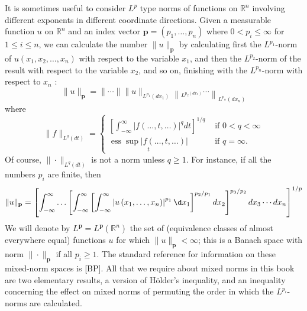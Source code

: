 \begin{para}
  It is sometimes useful to consider $L^p$ type norms of functions on $\mathbb{R}^n$ involving different exponents in different coordinate directions. Given a measurable function $u$ on $\mathbb{R}^n$ and an index vector $\mathbf{p}=\left(p_1, \ldots, p_n\right)$ where $0<p_i \leq \infty$ for $1 \leq i \leq n$, we can calculate the number $\|u\|_{\mathbf{p}}$ by calculating first the $L^{p_1}$-norm of $u\left(x_1, x_2, \ldots, x_n\right)$ with respect to the variable $x_1$, and then the $L^{p_2}$-norm of the result with respect to the variable $x_2$, and so on, finishing with the $L^{p_n}$-norm with respect to $x_n$ :
  \[
  \|u\|_{\mathbf{p}}=\|\cdots\|\|u\|_{L^{p_1}\left(d x_1\right)}\left\|_{L^{p_2\left(d x_2\right)}} \cdots\right\|_{L^{p_n}\left(d x_n\right)}
  \]
  where
  \[
  \|f\|_{L^q(d t)}= \begin{cases}{\left[\int_{-\infty}^{\infty}|f(\ldots, t, \ldots)|^q d t\right]^{1 / q}} & \text { if } 0<q<\infty \\ \underset{t}{\operatorname{ess} \sup |f(\ldots, t, \ldots)|} & \text { if } q=\infty .\end{cases}
  \]
  Of course, $\|\cdot\|_{L^q(d t)}$ is not a norm unless $q \geq 1$. For instance, if all the numbers $p_i$ are finite, then
  \[
  \|u\|_{\mathbf{p}}=\left[\int_{-\infty}^{\infty} \ldots\left[\int_{-\infty}^{\infty}\left[\int_{-\infty}^{\infty}\left|u\left(x_1, \ldots, x_n\right)\right|^{p_1} \d x_1\right]^{p_2 / p_1} d x_2\right]^{p_3 / p_2} d x_3 \cdots d x_n\right]^{1 / p}
  \]
  We will denote by $L^{\mathbf{p}}=L^{\mathbf{p}}\left(\mathbb{R}^n\right)$ the set of (equivalence classes of almost everywhere equal) functions $u$ for which $\|u\|_{\mathbf{p}}<\infty$; this is a Banach space with norm $\|\cdot\|_{\mathbf{p}}$ if all $p_i \geq 1$. The standard reference for information on these mixed-norm spaces is [BP]. All that we require about mixed norms in this book are two elementary results, a version of Hölder's inequality, and an inequality concerning the effect on mixed norms of permuting the order in which the $L^{p_i}$-norms are calculated.
\end{para}

